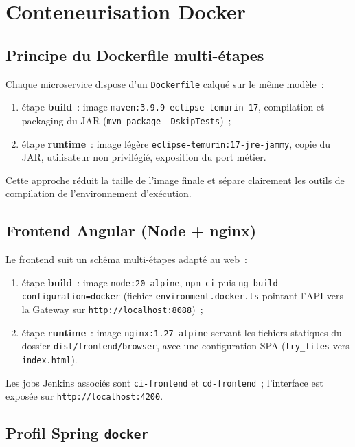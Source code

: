 \section{Conteneurisation Docker}

\subsection{Principe du Dockerfile multi-étapes}

Chaque microservice dispose d'un \texttt{Dockerfile} calqué sur le même
modèle~:
\begin{enumerate}
  \item étape \textbf{build}~: image \texttt{maven:3.9.9-eclipse-temurin-17},
        compilation et packaging du JAR (\texttt{mvn package -DskipTests})~;
  \item étape \textbf{runtime}~: image légère
        \texttt{eclipse-temurin:17-jre-jammy}, copie du JAR, utilisateur non
        privilégié, exposition du port métier.
\end{enumerate}

Cette approche réduit la taille de l'image finale et sépare clairement les
outils de compilation de l'environnement d'exécution.

\subsection{Frontend Angular (Node + nginx)}

Le frontend suit un schéma multi-étapes adapté au web~:
\begin{enumerate}
  \item étape \textbf{build}~: image \texttt{node:20-alpine},
        \texttt{npm ci} puis \texttt{ng build --configuration=docker}
        (fichier \texttt{environment.docker.ts} pointant l'API vers la
        Gateway sur \texttt{http://localhost:8088})~;
  \item étape \textbf{runtime}~: image \texttt{nginx:1.27-alpine} servant
        les fichiers statiques du dossier \texttt{dist/frontend/browser},
        avec une configuration SPA (\texttt{try\_files} vers
        \texttt{index.html}).
\end{enumerate}

Les jobs Jenkins associés sont \texttt{ci-frontend} et
\texttt{cd-frontend}~; l'interface est exposée sur
\texttt{http://localhost:4200}.

\subsection{Profil Spring \texttt{docker}}

